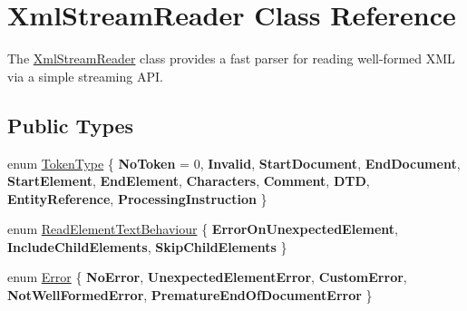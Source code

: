 \hypertarget{class_xml_stream_reader}{}\section{Xml\+Stream\+Reader Class Reference}
\label{class_xml_stream_reader}


The \hyperlink{class_xml_stream_reader}{Xml\+Stream\+Reader} class provides a fast parser for reading well-\/formed X\+ML via a simple streaming A\+PI.  


\subsection*{Public Types}
\begin{DoxyCompactItemize}
\item 
enum \hyperlink{class_xml_stream_reader_a99e2023f874f0ca648c996ae79c3b5f7}{Token\+Type} \{ \newline
{\bfseries No\+Token} = 0, 
{\bfseries Invalid}, 
{\bfseries Start\+Document}, 
{\bfseries End\+Document}, 
\newline
{\bfseries Start\+Element}, 
{\bfseries End\+Element}, 
{\bfseries Characters}, 
{\bfseries Comment}, 
\newline
{\bfseries D\+TD}, 
{\bfseries Entity\+Reference}, 
{\bfseries Processing\+Instruction}
 \}
\item 
enum \hyperlink{class_xml_stream_reader_aa67823f6737762b7e1a426ac841e29fa}{Read\+Element\+Text\+Behaviour} \{ {\bfseries Error\+On\+Unexpected\+Element}, 
{\bfseries Include\+Child\+Elements}, 
{\bfseries Skip\+Child\+Elements}
 \}
\item 
enum \hyperlink{class_xml_stream_reader_ae7aa6749ae6e9de9bcb6f084a9884286}{Error} \{ \newline
{\bfseries No\+Error}, 
{\bfseries Unexpected\+Element\+Error}, 
{\bfseries Custom\+Error}, 
{\bfseries Not\+Well\+Formed\+Error}, 
\newline
{\bfseries Premature\+End\+Of\+Document\+Error}
 \}
\end{DoxyCompactItemize}
